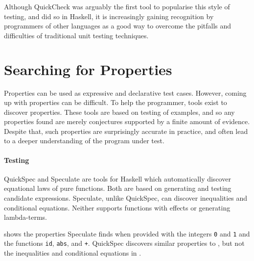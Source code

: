 Although QuickCheck was arguably the first tool to popularise this style of
testing, and did so in Haskell, it is increasingly gaining recognition by
programmers of other languages as a good way to overcome the pitfalls and
difficulties of traditional unit testing techniques.

\section{Searching for Properties}
\label{sec:property_testing-gen}

Properties can be used as expressive and declarative test cases.
However, coming up with properties can be difficult.  To help the
programmer, tools exist to discover properties.  These tools are based
on testing of examples, and so any properties found are merely
conjectures supported by a finite amount of evidence.  Despite that,
such properties are surprisingly accurate in practice, and often lead
to a deeper understanding of the program under test.

\paragraph{Testing}
QuickSpec \parencite{claessen2010,smallbone2017} and
Speculate \parencite{braquehais2017} are tools for Haskell which
automatically discover equational laws of pure functions.  Both are
based on generating and testing candidate expressions.  Speculate,
unlike QuickSpec, can discover inequalities and conditional equations.
Neither supports functions with effects or generating lambda-terms.

 shows the properties Speculate finds when
provided with the integers \verb|0| and \verb|1| and the functions
\verb|id|, \verb|abs|, and \verb|+|.  QuickSpec discovers similar
properties to , but not the inequalities and
conditional equations in .

